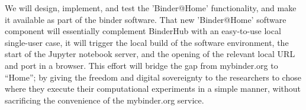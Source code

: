 \begin{task}
We will design, implement, and test the 'Binder@Home' functionality, and make it
available as part of the binder software. That new 'Binder@Home' software component will
essentially complement BinderHub with an easy-to-use local single-user case, it will trigger
the local build of the software environment, the start of the Jupyter notebook
server, and the opening of the relevant local URL and port in a browser.
This effort will bridge the gap from mybinder.org to ``Home'';
by giving the freedom and digital sovereignty
to the researchers to chose where they execute their computational experiments in a simple manner,
without sacrificing the convenience of the mybinder.org service.

\end{task}
